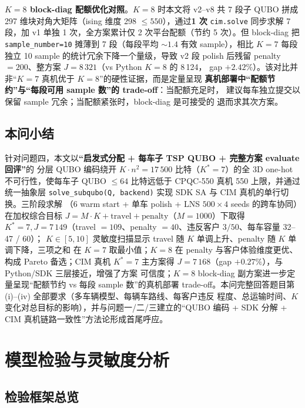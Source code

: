 \documentclass[UTF8,12pt,a4paper]{ctexart}
\begin{document}
\textbf{$K\!=\!8$ block-diag 配额优化对照}。$K=8$ 时本文将 v2--v8 共 7 段子 QUBO
拼成 297 维块对角大矩阵（ising 维度 298 $\le 550$），通过\textbf{1 次}
\texttt{cim.solve} 同步求解 7 段，加 v1 单独 1 次，全方案累计仅 2 次平台配额（节约
5 次）。但 block-diag 把 \texttt{sample\_number=10} 摊薄到 7 段（每段平均 $\sim\!1.4$
有效 sample），相比 $K=7$ 每段独立 10 sample 的统计冗余下降一个量级，导致 v2 段
polish 后残留 penalty $=200$、整方案 $J=8\,321$（vs Python $K=8$ 的 8\,124，
gap $+2.42\%$）。该对比并非``$K=7$ 真机优于 $K=8$''的硬性证据，而是定量呈现
\textbf{真机部署中``配额节约''与``每段可用 sample 数''的 trade-off}：当配额充足时，
建议每车独立提交以保留 sample 冗余；当配额紧张时，block-diag 是可接受的
退而求其次方案。

\subsection{本问小结}
\label{subsec:q4-summary}

针对问题四，本文以\textbf{``启发式分配 + 每车子 TSP QUBO + 完整方案 evaluate 回评''}的
分层 QUBO 编码绕开 $K\!\cdot\!n^{2}=17\,500$ 比特（$K^{*}\!=\!7$）的全 3D one-hot 不可行性，使每车子 QUBO
$\le 64$ 比特远低于 CPQC-550 真机 550 上限，并通过统一抽象层
\texttt{solve\_subqubo(Q, backend)} 实现 SDK SA 与 CIM 真机的单行切换。三阶段求解
（6 warm start + 单车 polish + LNS $500\!\times\!4$ seeds 的跨车协同）在加权综合目标
$J=M\!\cdot\!K+\mathrm{travel}+\mathrm{penalty}$（$M=1000$）下取得
$K^*=7,J=7\,149$（travel $=109$、penalty $=40$、违反客户 $3/50$、每车容量 32--47 / 60）；
$K\in[5,10]$ 灵敏度扫描显示 travel 随 $K$ 单调上升、penalty 随 $K$ 单调下降，三项之和
在 $K=7$ 取最小值；$K=8$ 在 penalty 与客户体验维度更优、构成 Pareto 备选；CIM 真机
$K^*\!=\!7$ 主方案得 $J=7\,168$（gap $+0.27\%$），与 Python/SDK 三层接近，增强了方案
可信度；$K=8$ block-diag 副方案进一步定量呈现``配额节约 vs 每段 sample 数''的真机部署
trade-off。本问完整回答题目第 (i)--(iv) 全部要求（多车辆模型、每辆车路线、每客户违反
程度、总运输时间、$K$ 变化对总目标的影响），并与问题一/二/三建立的``QUBO 编码 +
SDK 分解 + CIM 真机链路一致性''方法论形成首尾呼应。

\section{模型检验与灵敏度分析}

\subsection{检验框架总览}
\end{document}
